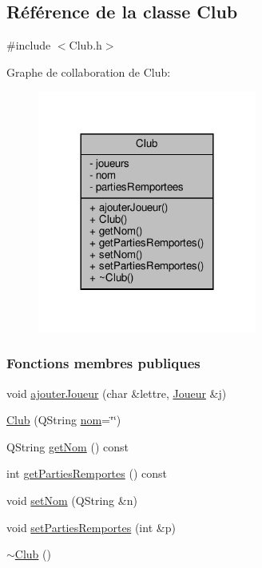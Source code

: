 \hypertarget{class_club}{}\subsection{Référence de la classe Club}
\label{class_club}


{\ttfamily \#include $<$Club.\+h$>$}



Graphe de collaboration de Club\+:
\nopagebreak
\begin{figure}[H]
\begin{center}
\leavevmode
\includegraphics[width=204pt]{class_club__coll__graph}
\end{center}
\end{figure}
\subsubsection*{Fonctions membres publiques}
\begin{DoxyCompactItemize}
\item 
void \hyperlink{class_club_af7cf902fc29f6d587b11a10eec87edff}{ajouter\+Joueur} (char \&lettre, \hyperlink{class_joueur}{Joueur} \&j)
\item 
\hyperlink{class_club_a6d6fa5971608a06394c40453289d6251}{Club} (Q\+String \hyperlink{class_club_a18e1489d02110a82a0c8706f52091002}{nom}=\char`\"{}\char`\"{})
\item 
Q\+String \hyperlink{class_club_aaa3c96659bf305d7a1988ecbd27de30f}{get\+Nom} () const
\item 
int \hyperlink{class_club_af4f28219aa51c3742cddfae4b66cec4b}{get\+Parties\+Remportes} () const
\item 
void \hyperlink{class_club_a6cb8e81d8cfd3d5febd6ce48e33ba94e}{set\+Nom} (Q\+String \&n)
\item 
void \hyperlink{class_club_ad1711f2742e385ef00174b3ebd98b165}{set\+Parties\+Remportes} (int \&p)
\item 
\hyperlink{class_club_a1c2993e141cfa6468284274359cc7de5}{$\sim$\+Club} ()
\end{DoxyCompactItemize}
